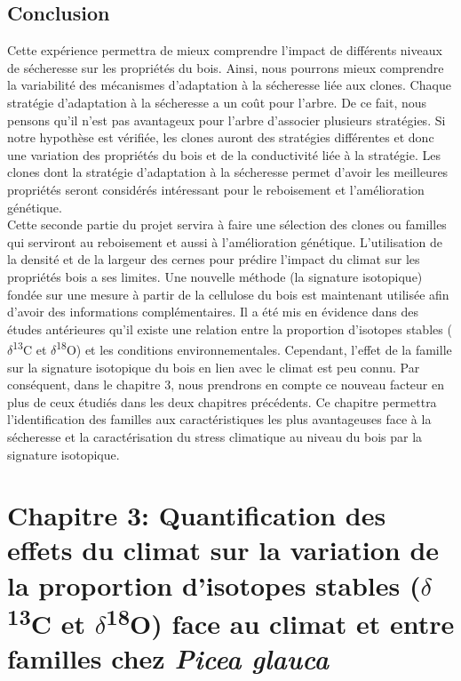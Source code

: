 \documentclass{report}
\newcommand{\Ctreize}{$\delta$\textsuperscript{13}C\xspace}
\newcommand{\Odixhuit}{$\delta$\textsuperscript{18}O\xspace}
\begin{document}
\section{Conclusion}

Cette expérience permettra de mieux comprendre l'impact de différents niveaux de sécheresse sur les propriétés du bois. Ainsi, nous pourrons mieux comprendre la variabilité des mécanismes d'adaptation à la sécheresse liée aux clones. Chaque stratégie d'adaptation à la sécheresse a un coût pour l'arbre. De ce fait, nous pensons qu'il n'est pas avantageux pour l'arbre d'associer plusieurs stratégies. Si notre hypothèse est vérifiée, les clones auront des stratégies différentes et donc une variation des propriétés du bois et de la conductivité liée à la stratégie. Les clones dont la stratégie d'adaptation à la sécheresse permet d'avoir les meilleures propriétés seront considérés intéressant pour le reboisement et l'amélioration génétique.\\

Cette seconde partie du projet servira à faire une sélection des clones ou familles qui serviront au reboisement et aussi à l'amélioration génétique. L'utilisation de la densité et de la largeur des cernes pour prédire l'impact du climat sur les propriétés bois a ses limites. Une nouvelle méthode (la signature isotopique) fondée sur une mesure à partir de la cellulose du bois est maintenant utilisée afin d'avoir des informations complémentaires. Il a été mis en évidence dans des études antérieures qu'il existe une relation entre la proportion d'isotopes stables (\Ctreize et \Odixhuit) et les conditions environnementales. Cependant, l'effet de la famille sur la signature isotopique du bois en lien avec le climat est peu connu.  Par conséquent, dans le chapitre 3, nous prendrons en compte ce nouveau facteur en plus de ceux étudiés dans les deux chapitres précédents. Ce chapitre permettra l'identification des familles aux caractéristiques les plus avantageuses face à la sécheresse et la caractérisation du stress climatique au niveau du bois par la signature isotopique.


\chapter{Chapitre 3: Quantification des effets du climat sur la variation de la proportion d'isotopes stables (\Ctreize et \Odixhuit) face au climat et entre familles chez \textit{Picea glauca}}
\end{document}
